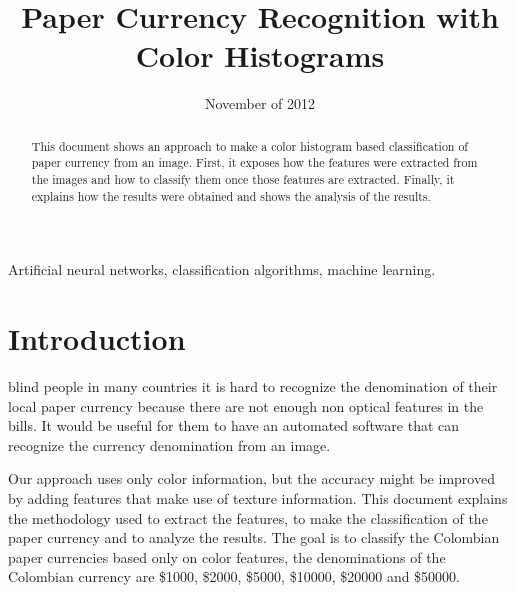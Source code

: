 \documentclass{IEEEtran}
\begin{document}
\title{Paper Currency Recognition with Color Histograms}
\date {November of 2012}
\author{
}
\maketitle


\begin{abstract}
This document shows an approach to make a color histogram based classification of paper currency from an image.
First, it exposes how the features were extracted from the images and how to classify them once those features
are extracted. Finally, it explains how the results were obtained and shows the analysis of the results.
\end{abstract}

\begin{IEEEkeywords}
Artificial neural networks, classification algorithms, machine learning.
\end{IEEEkeywords}

\section{Introduction}
 blind people in many countries it is hard to recognize the denomination of their local paper currency because
there are not enough non optical features in the bills. It would be useful for them to have an automated software that
can recognize the currency denomination from an image.


Our approach uses only color information, but the accuracy might be improved by adding features that make use of
texture information. This document explains the methodology used to extract the features, to make the classification
of the paper currency and to analyze the results. The goal is to classify the Colombian paper currencies based only
on color features, the denominations of the Colombian currency are \$1000, \$2000, \$5000, \$10000, \$20000 and
\$50000.
\end{document}
